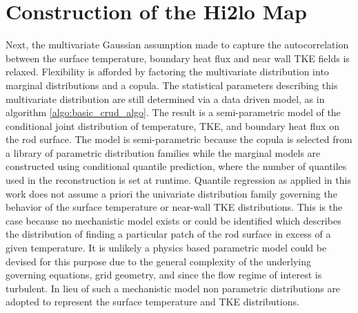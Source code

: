 

\section{Construction of the Hi2lo Map}

Next, the multivariate Gaussian assumption made to capture the autocorrelation between the surface temperature, boundary heat flux and near wall TKE fields is relaxed.  Flexibility is afforded by factoring the multivariate distribution into marginal distributions and a copula.  The statistical parameters describing this multivariate distribution are still determined via a data driven model, as in algorithm \ref{algo:basic_crud_algo}.
The result is a semi-parametric model of the conditional joint distribution of temperature, TKE, and boundary heat flux on the rod surface.  The model is semi-parametric because the copula is selected from a library of parametric distribution families while the marginal models are constructed using conditional quantile prediction, where the number of quantiles used in the reconstruction is set at runtime.  Quantile regression as applied in this work does not assume a priori the univariate distribution family governing the behavior of the surface temperature or near-wall TKE distributions.  This is the case because no mechanistic model exists or could be identified which describes the distribution of finding a particular patch of the rod surface in excess of a given temperature.  It is unlikely a physics based parametric model could be devised for this purpose due to the general complexity of the underlying governing equations, grid geometry, and since the flow regime of interest is turbulent.  In lieu of such a mechanistic model non parametric distributions are adopted to represent the surface temperature and TKE distributions.

